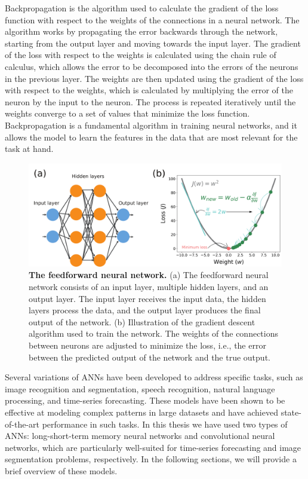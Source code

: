 Backpropagation is the algorithm used to calculate the gradient of the loss
function with respect to the weights of the connections in a neural network.
The algorithm works by propagating the error backwards through the network,
starting from the output layer and moving towards the input layer. The
gradient of the loss with respect to the weights is calculated using the
chain
rule of calculus, which allows the error to be decomposed into the errors of
the neurons in the previous layer. The weights are then updated using the
gradient of the loss with respect to the weights, which is calculated by
multiplying the error of the neuron by the input to the neuron. The process
is
repeated iteratively until the weights converge to a set of values that
minimize the loss function. Backpropagation is a fundamental algorithm in
training neural networks, and it allows the model to learn the features in
the
data that are most relevant for the task at hand.

\begin{figure}[H]
  \centering
  \includegraphics[width=1\textwidth]{Figures/ANN.pdf}
  \caption[The feedforward neural network]{
    \textbf{The feedforward neural network.} (a) The feedforward neural
    network
    consists of an input layer, multiple hidden layers, and an output layer.
    The input layer receives the input data, the hidden layers process the
    data, and the output layer produces the final output of the network.
    (b) Illustration of the gradient descent algorithm used to train the
    network. The weights of the connections between neurons are adjusted to
    minimize the loss, i.e., the error between the predicted output of the
    network and the true output.}
  \label{fig:ANN}
\end{figure}

Several variations of ANNs have been developed to address specific tasks, such
as image recognition and segmentation, speech recognition, natural language
processing, and time-series forecasting. These models have been shown to be
effective at modeling complex patterns in large datasets and have achieved
state-of-the-art performance in such tasks. In this thesis we have used two
types of ANNs: long-short-term memory neural networks and convolutional neural
networks, which are particularly well-suited for time-series forecasting and
image segmentation problems, respectively. In the following sections, we will
provide a brief overview of these models.

